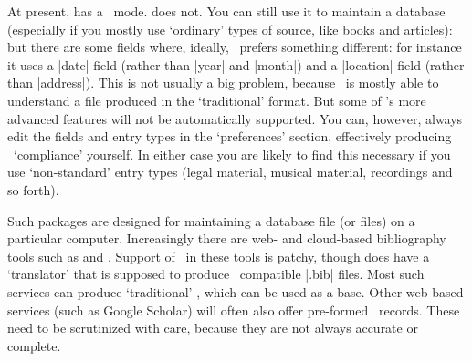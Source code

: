 At present,  has a \biblatex\ mode.  does not. You can still use it to maintain a database (especially if you mostly use `ordinary' types of source, like books and articles): but there are some fields where, ideally, \biblatex\ prefers something different: for instance it uses a |date| field (rather than |year| and |month|) and a |location| field (rather than |address|). This is not usually a big problem, because \biblatex\ is mostly able to understand a file produced in the `traditional' format. But some of \biblatex's more advanced features will not be automatically supported. You can, however, always edit the fields and entry types in the `preferences' section, effectively producing \biblatex\ `compliance' yourself. In either case you are likely to find this necessary if you use `non-standard' entry types (legal material, musical material, recordings and so forth).

Such packages are designed for maintaining a database file (or files) on a particular computer. Increasingly there are web- and cloud-based bibliography tools such as  and . Support of \biblatex\ in these tools is patchy, though  does have a `translator' that is supposed to produce \biblatex\ compatible |.bib| files. Most such services can produce `traditional' \bibtex, which can be used as a base. Other web-based services (such as Google Scholar) will often also offer pre-formed \bibtex\ records. These need to be scrutinized with care, because they are not always accurate or complete.